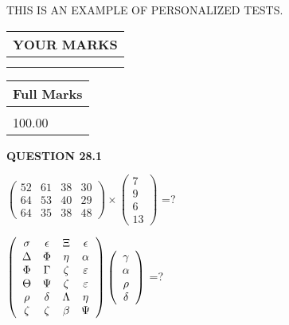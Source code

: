 \documentclass[12pt]{article}
\begin{document}
   
 \vspace{0.2in}
{\Huge  THIS IS AN EXAMPLE OF}
{\Huge  PERSONALIZED TESTS. }
   
   
  
\vspace{0.2in}
  
\noindent\begin{tabular}{|l|}
\hline
 YOUR MARKS  \\
\hline
 \\ 
 \\ 
\hline
\end{tabular}
\hspace{0.05in} \begin{tabular}{|l|}
\hline
 Full Marks  \\
\hline
 \\ 
100.00 \\
\hline
\end{tabular}
{\textbf{\Large{QUESTION
28.1 
}}}
  
  
 
$ \left( \begin{array}{ccccccccc}
          52  & 
          61  & 
          38  & 
          30  \\ 
          64  & 
          53  & 
          40  & 
          29  \\ 
          64  & 
          35  & 
          38  & 
          48
\end{array}\right) \times
\left( \begin{array}{c}
           7  \\ 
           9  \\ 
           6  \\ 
          13
\end{array}\right) $ =?
 
 
$  %
 \left( \begin{array}
 {
 c
 c
 c
 c
 }
 \sigma & 
 \epsilon & 
                    \Xi & 
 \epsilon \\ 
 \Delta & 
 \Phi & 
 \eta & 
 \alpha \\ 
 \Phi & 
 \Gamma & 
                    \zeta & 
 \varepsilon \\ 
 \Theta & 
 \Psi & 
                    \zeta & 
 \varepsilon \\ 
 \rho & 
 \delta & 
 \Lambda & 
 \eta \\ 
                    \zeta & 
                    \zeta & 
 \beta & 
 \Psi
 \end{array} \right)
 \left( \begin{array}
 {
 c
 }
 \gamma \\ 
 \alpha \\ 
 \rho \\ 
 \delta
 \end{array} \right)
$ =?
 
\end{document}
